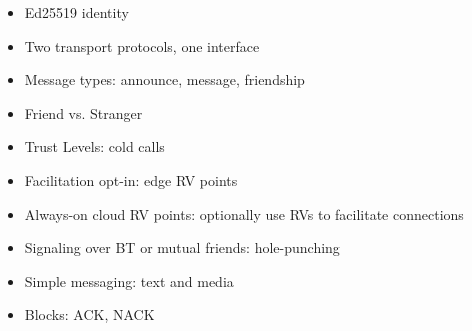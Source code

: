 

\begin{itemize}
    \item Ed25519 identity
    \item Two transport protocols, one interface
    \item Message types: announce, message, friendship
    \item Friend vs. Stranger
    \item Trust Levels: cold calls
    \item Facilitation opt-in: edge RV points
    \item Always-on cloud RV points: optionally use RVs to facilitate connections
    \item Signaling over BT or mutual friends: hole-punching 
    \item Simple messaging: text and media
    \item Blocks: ACK, NACK
\end{itemize}